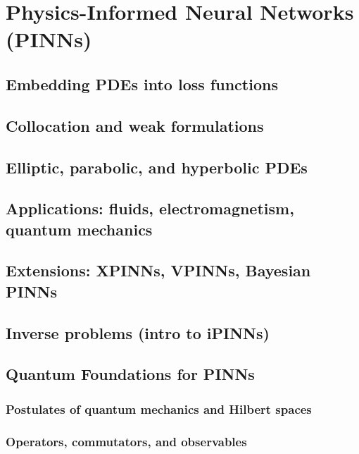 ﻿\chapter{Physics-Informed Neural Networks (PINNs)}

\section{Embedding PDEs into loss functions}

\section{Collocation and weak formulations}

\section{Elliptic, parabolic, and hyperbolic PDEs}

\section{Applications: fluids, electromagnetism, quantum mechanics}

\section{Extensions: XPINNs, VPINNs, Bayesian PINNs}

\section{Inverse problems (intro to iPINNs)}

\section{Quantum Foundations for PINNs} %

\subsection{Postulates of quantum mechanics and Hilbert spaces}

\subsection{Operators, commutators, and observables}

